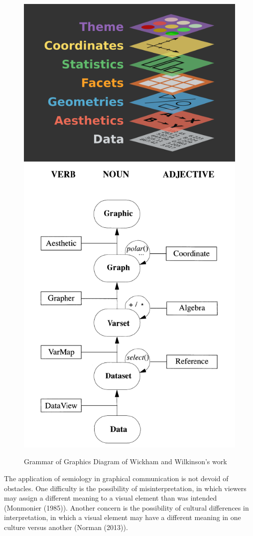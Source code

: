\documentclass[print]{nuthesis}
\begin{document}
\begin{figure}

{\centering \includegraphics[width=0.45\linewidth]{figure/gglayers} \includegraphics[width=0.45\linewidth]{figure/graphic-flowchart} 

}

\caption{Grammar of Graphics Diagram of Wickham and Wilkinson's work}\label{fig:graphics2}
\end{figure}

The application of semiology in graphical communication is not devoid of obstacles.
One difficulty is the possibility of misinterpretation, in which viewers may assign a different meaning to a visual element than was intended (Monmonier (1985)).
Another concern is the possibility of cultural differences in interpretation, in which a visual element may have a different meaning in one culture versus another (Norman (2013)).
\end{document}
